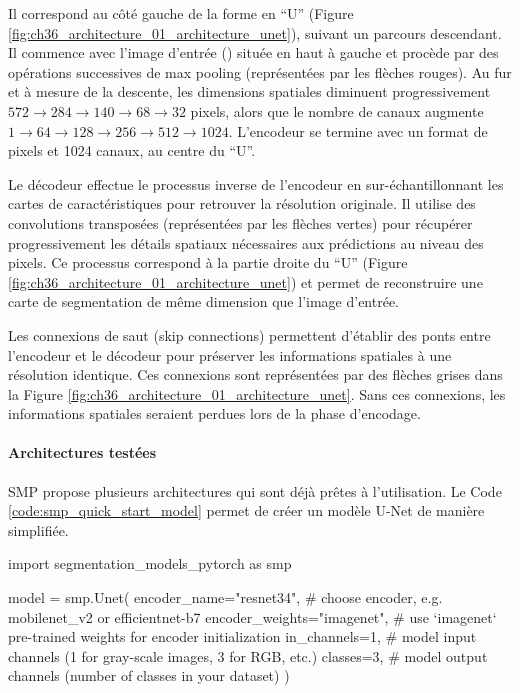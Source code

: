 Il correspond au côté gauche de la forme en ``U'' (Figure \ref{fig:ch36_architecture_01_architecture_unet}), suivant un parcours descendant. Il commence avec l'image d'entrée (\si{}) située en haut à gauche et procède par des opérations successives de max pooling (représentées par les flèches rouges). Au fur et à mesure de la descente, les dimensions spatiales diminuent progressivement $572 \rightarrow 284 \rightarrow 140 \rightarrow 68 \rightarrow 32$ pixels, alors que le nombre de canaux augmente $1 \rightarrow 64 \rightarrow 128 \rightarrow 256 \rightarrow 512 \rightarrow 1024$. L'encodeur se termine avec un format de \si{} pixels et 1024 canaux, au centre du ``U''.

Le décodeur effectue le processus inverse de l'encodeur en sur-échantillonnant les cartes de caractéristiques pour retrouver la résolution originale. Il utilise des convolutions transposées (représentées par les flèches vertes) pour récupérer progressivement les détails spatiaux nécessaires aux prédictions au niveau des pixels. Ce processus correspond à la partie droite du ``U'' (Figure \ref{fig:ch36_architecture_01_architecture_unet}) et permet de reconstruire une carte de segmentation de même dimension que l'image d'entrée.

Les connexions de saut (skip connections) permettent d'établir des ponts entre l'encodeur et le décodeur pour préserver les informations spatiales à une résolution identique. Ces connexions sont représentées par des flèches grises dans la Figure \ref{fig:ch36_architecture_01_architecture_unet}. Sans ces connexions, les informations spatiales seraient perdues lors de la phase d'encodage.

\paragraph{Architectures testées}
SMP propose plusieurs architectures qui sont déjà prêtes à l'utilisation. Le Code \ref{code:smp_quick_start_model} permet de créer un modèle U-Net de manière simplifiée.

\begin{code}[H]
    \begin{pythoncode}
    import segmentation_models_pytorch as smp
    
    model = smp.Unet(
        encoder_name="resnet34",        # choose encoder, e.g. mobilenet_v2 or efficientnet-b7
        encoder_weights="imagenet",     # use `imagenet` pre-trained weights for encoder initialization
        in_channels=1,                  # model input channels (1 for gray-scale images, 3 for RGB, etc.)
        classes=3,                      # model output channels (number of classes in your dataset)
    )
    \end{pythoncode}
    \label{code:smp_quick_start_model}
\end{code}

